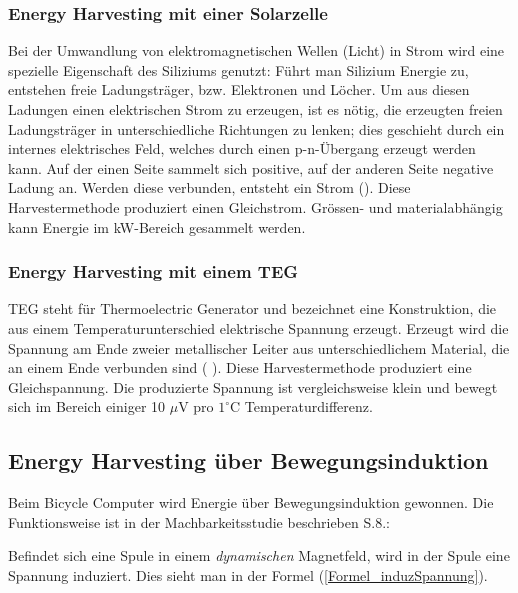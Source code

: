 \subsubsection{Energy Harvesting mit einer Solarzelle}\label{harv_solarzelle} 

Bei der Umwandlung von elektromagnetischen Wellen (Licht) in Strom wird eine spezielle Eigenschaft des Siliziums genutzt: Führt man Silizium Energie zu, entstehen freie Ladungsträger, bzw. Elektronen und Löcher. Um aus diesen Ladungen einen elektrischen Strom zu erzeugen, ist es nötig, die erzeugten freien Ladungsträger in unterschiedliche Richtungen zu lenken; dies geschieht durch ein internes elektrisches Feld, welches durch einen p-n-Übergang erzeugt werden kann. Auf der einen Seite sammelt sich positive, auf der anderen Seite negative Ladung an. Werden diese verbunden, entsteht ein Strom (\cite{Internet_Solarzelle2}). 
Diese Harvestermethode produziert einen Gleichstrom. Grössen- und materialabhängig kann Energie im kW-Bereich gesammelt werden.


\subsubsection{Energy Harvesting mit einem TEG}\label{harv_TEG} 
TEG steht für Thermoelectric Generator und bezeichnet eine Konstruktion, die aus einem Temperaturunterschied elektrische Spannung erzeugt. Erzeugt wird die Spannung am Ende zweier metallischer Leiter aus unterschiedlichem Material, die an einem Ende verbunden sind ( \cite{Journal_TEG}). Diese Harvestermethode produziert eine Gleichspannung. Die produzierte Spannung ist vergleichsweise klein und bewegt sich im Bereich einiger 10 $\mu$V pro $1^\circ$C Temperaturdifferenz.


\subsection{Energy Harvesting über Bewegungsinduktion}\label{harv_bewegung} 
Beim Bicycle Computer wird Energie über Bewegungsinduktion gewonnen. Die Funktionsweise ist in der Machbarkeitsstudie beschrieben \cite{PA_bicycle} S.8.:


Befindet sich eine Spule in einem \textit{dynamischen} \glqq Magnetfeld\grqq, wird in der Spule eine Spannung induziert. Dies sieht man in der Formel (\ref{Formel_induzSpannung}).

